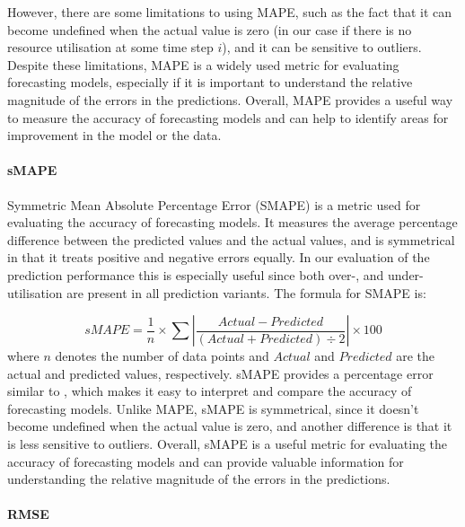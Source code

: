       However, there are some limitations to using MAPE, such as the fact that it can become undefined when the actual value is zero (in our case if there is no resource utilisation at some time step $i$), and it can be sensitive to outliers.
      Despite these limitations, MAPE is a widely used metric for evaluating forecasting models, especially if it is important to understand the relative magnitude of the errors in the predictions. 
      Overall, MAPE provides a useful way to measure the accuracy of forecasting models and can help to identify areas for improvement in the model or the data.


    \paragraph{sMAPE}
    \label{par:smape-metrics-evaluation}
    
      Symmetric Mean Absolute Percentage Error (SMAPE) \cite{kreinovichHowEstimateForecasting2014} is a metric used for evaluating the accuracy of forecasting models. It measures the average percentage difference between the predicted values and the actual values, and is symmetrical in that it treats positive and negative errors equally.
      In our evaluation of the prediction performance this is especially useful since both over-, and under-utilisation are present in all prediction variants.
      The formula for SMAPE is:

      $$sMAPE = \frac{1}{n} \times \sum \left|\frac{Actual - Predicted}{\left(Actual + Predicted\right) \div 2}\right| \times 100$$
      where $n$ denotes the number of data points and $Actual$ and $Predicted$ are the actual and predicted values, respectively.
      sMAPE provides a percentage error similar to , which makes it easy to interpret and compare the accuracy of forecasting models. Unlike MAPE, sMAPE is symmetrical, since it doesn't become undefined when the actual value is zero, and another difference is that it is less sensitive to outliers.
      Overall, sMAPE is a useful metric for evaluating the accuracy of forecasting models and can provide valuable information for understanding the relative magnitude of the errors in the predictions.

    \paragraph{RMSE}
    \label{par:rmse-metrics-evaluation}

